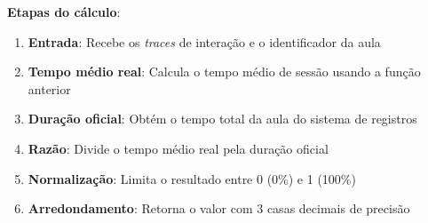 \textbf{Etapas do cálculo}:
\begin{enumerate}
    \item \textbf{Entrada}: Recebe os \textit{traces} de interação e o identificador da aula
    \item \textbf{Tempo médio real}: Calcula o tempo médio de sessão usando a função anterior
    \item \textbf{Duração oficial}: Obtém o tempo total da aula do sistema de registros
    \item \textbf{Razão}: Divide o tempo médio real pela duração oficial
    \item \textbf{Normalização}: Limita o resultado entre 0 (0\%) e 1 (100\%)
    \item \textbf{Arredondamento}: Retorna o valor com 3 casas decimais de precisão
\end{enumerate}

